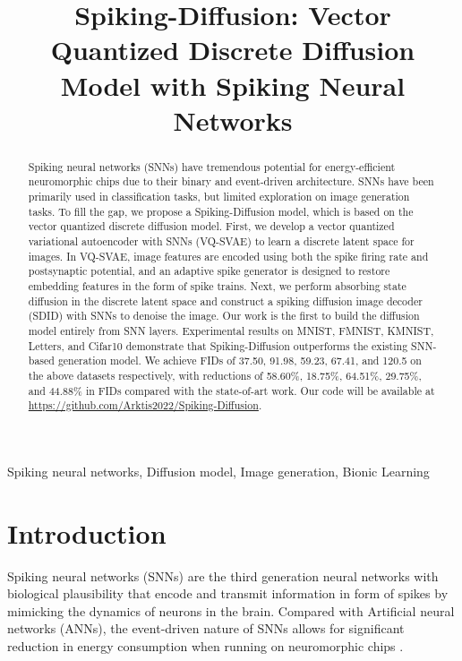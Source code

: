 \documentclass{article}
\title{Spiking-Diffusion: Vector Quantized Discrete Diffusion Model with Spiking Neural Networks}
\begin{document}
\topmargin=0mm
\maketitle
\begin{abstract}
Spiking neural networks (SNNs) have tremendous potential for energy-efficient neuromorphic chips due to their binary and event-driven architecture. SNNs have been primarily used in classification tasks, but limited exploration on image generation tasks. To fill the gap, we propose a Spiking-Diffusion model, which is based on the vector quantized discrete diffusion model. First, we develop a vector quantized variational autoencoder with SNNs (VQ-SVAE) to learn a discrete latent space for images. In VQ-SVAE, image features are encoded using both the spike firing rate and postsynaptic potential, and an adaptive spike generator is designed to restore embedding features in the form of spike trains. Next, we perform absorbing state diffusion in the discrete latent space and construct a spiking diffusion image decoder (SDID) with SNNs to denoise the image. Our work is the first to build the diffusion model entirely from SNN layers. Experimental results on MNIST, FMNIST, KMNIST, Letters, and Cifar10 demonstrate that Spiking-Diffusion outperforms the existing SNN-based generation model. We achieve FIDs of 37.50, 91.98, 59.23, 67.41, and 120.5 on the above datasets respectively, with reductions  of 58.60\%, 18.75\%, 64.51\%, 29.75\%, and 44.88\% in FIDs compared with the state-of-art work. Our code will be available at \url{https://github.com/Arktis2022/Spiking-Diffusion}.
\end{abstract}
\begin{keywords}
Spiking neural networks, Diffusion model, Image generation, Bionic Learning
\end{keywords}
\section{Introduction}
Spiking neural networks (SNNs) are the third generation neural networks with biological plausibility that encode and transmit information in form of spikes by mimicking the dynamics of neurons in the brain. Compared with Artificial neural networks (ANNs), the event-driven nature of SNNs allows for significant reduction in energy consumption when running on neuromorphic chips \cite{b6}.
\end{document}
